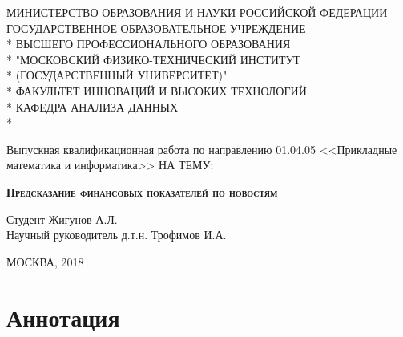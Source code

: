 \documentclass[pdftex,ptm,14pt,a4paper]{report}
\begin{document}
\begin{titlepage}

\newpage

\begin{center}
МИНИСТЕРСТВО ОБРАЗОВАНИЯ И НАУКИ РОССИЙСКОЙ ФЕДЕРАЦИИ \\
\vspace{0.5cm}
ГОСУДАРСТВЕННОЕ ОБРАЗОВАТЕЛЬНОЕ УЧРЕЖДЕНИЕ \\*
ВЫСШЕГО ПРОФЕССИОНАЛЬНОГО ОБРАЗОВАНИЯ\\*
"МОСКОВСКИЙ ФИЗИКО-ТЕХНИЧЕСКИЙ ИНСТИТУТ \\*
(ГОСУДАРСТВЕННЫЙ УНИВЕРСИТЕТ)" \\*
\vspace{0.5cm}
ФАКУЛЬТЕТ ИННОВАЦИЙ И ВЫСОКИХ ТЕХНОЛОГИЙ \\*
КАФЕДРА АНАЛИЗА ДАННЫХ \\*
\hrulefill
\end{center}


\vspace{8em}

\begin{center}
\Large Выпускная квалификационная работа по направлению 01.04.05 <<Прикладные математика и информатика>> \linebreak НА ТЕМУ:
\end{center}

\vspace{2.5em}

\begin{center}
\textsc{\large{\textbf{Предсказание финансовых показателей по новостям}}}
\end{center}

\vspace{7em}

\begin{flushleft}
Студент \hrulefill Жигунов А.Л. \\
\vspace{1.5em}
Научный руководитель д.т.н. \hrulefill Трофимов И.А.\\
\end{flushleft}

\vspace{\fill}

\begin{center}
МОСКВА, 2018
\end{center}

\end{titlepage}

\section{Аннотация}
\end{document}
